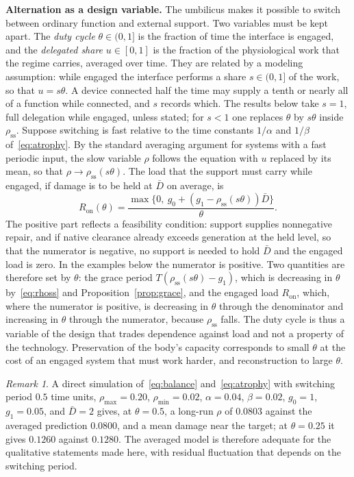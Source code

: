 \documentclass[11pt]{article}
\theoremstyle{plain}
\theoremstyle{definition}
\theoremstyle{remark}
\newtheorem{remark}{Remark}
\begin{document}
\textbf{Alternation as a design variable.} The umbilicus makes it possible to switch between ordinary function and external support. Two variables must be kept apart. The \emph{duty cycle} $\theta\in(0,1]$ is the fraction of time the interface is engaged, and the \emph{delegated share} $u\in[0,1]$ is the fraction of the physiological work that the regime carries, averaged over time. They are related by a modeling assumption: while engaged the interface performs a share $s\in(0,1]$ of the work, so that $u=s\theta$. A device connected half the time may supply a tenth or nearly all of a function while connected, and $s$ records which. The results below take $s=1$, full delegation while engaged, unless stated; for $s<1$ one replaces $\theta$ by $s\theta$ inside $\rho_{\mathrm{ss}}$. Suppose switching is fast relative to the time constants $1/\alpha$ and $1/\beta$ of~\eqref{eq:atrophy}. By the standard averaging argument for systems with a fast periodic input, the slow variable $\rho$ follows the equation with $u$ replaced by its mean, so that $\rho\to\rho_{\mathrm{ss}}(s\theta)$. The load that the support must carry while engaged, if damage is to be held at $\bar D$ on average, is
\begin{equation}\label{eq:Ron}
R_{\mathrm{on}}(\theta)=\frac{\max\{0,\ g_0+(g_1-\rho_{\mathrm{ss}}(s\theta))\bar D\}}{\theta}.
\end{equation}
The positive part reflects a feasibility condition: support supplies nonnegative repair, and if native clearance already exceeds generation at the held level, so that the numerator is negative, no support is needed to hold $\bar D$ and the engaged load is zero. In the examples below the numerator is positive. Two quantities are therefore set by $\theta$: the grace period $T(\rho_{\mathrm{ss}}(s\theta)-g_1)$, which is decreasing in $\theta$ by~\eqref{eq:rhoss} and Proposition~\ref{prop:grace}, and the engaged load $R_{\mathrm{on}}$, which, where the numerator is positive, is decreasing in $\theta$ through the denominator and increasing in $\theta$ through the numerator, because $\rho_{\mathrm{ss}}$ falls. The duty cycle is thus a variable of the design that trades dependence against load and not a property of the technology. Preservation of the body's capacity corresponds to small $\theta$ at the cost of an engaged system that must work harder, and reconstruction to large $\theta$.

\begin{remark}
A direct simulation of~\eqref{eq:balance} and~\eqref{eq:atrophy} with switching period $0.5$ time units, $\rho_{\max}=0.20$, $\rho_{\min}=0.02$, $\alpha=0.04$, $\beta=0.02$, $g_0=1$, $g_1=0.05$, and $\bar D=2$ gives, at $\theta=0.5$, a long-run $\rho$ of $0.0803$ against the averaged prediction $0.0800$, and a mean damage near the target; at $\theta=0.25$ it gives $0.1260$ against $0.1280$. The averaged model is therefore adequate for the qualitative statements made here, with residual fluctuation that depends on the switching period.
\end{remark}
\end{document}
